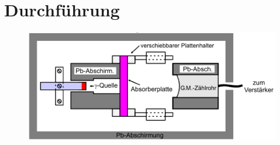 \section{Durchführung}
\label{sec:Durchführung}

\begin{figure}
    \centering
    \includegraphics[width = .7\textwidth]{content/Aufbau.png}
    \label{fig:Aufbau}
\end{figure}
